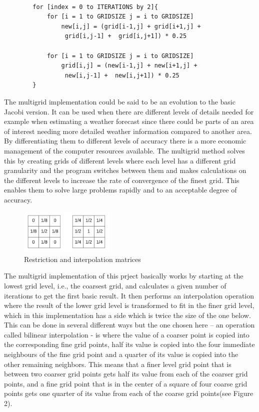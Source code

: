 \documentclass{article}
\begin{document}
\begin{verbatim}

        for [index = 0 to ITERATIONS by 2]{
            for [i = 1 to GRIDSIZE j = i to GRIDSIZE]
                new[i,j] = (grid[i-1,j] + grid[i+1,j] +
                 grid[i,j-1] +  grid[i,j+1]) * 0.25
	
            for [i = 1 to GRIDSIZE j = i to GRIDSIZE]
                grid[i,j] = (new[i-1,j] + new[i+1,j] + 
                 new[i,j-1] +  new[i,j+1]) * 0.25
        }

\end{verbatim}


The multigrid implementation could be said to be an evolution to the basic Jacobi version. It can be used when there are different levels of details needed for example when estimating a weather forecast since there could be parts of an area of interest needing more detailed weather information compared to another area. By differentiating them to different levels of accuracy there is a more economic management of the computer resources available. The multigrid method solves this by creating grids of different levels where each level has a different grid granularity and the program switches between them and makes calculations on the different levels to increase the rate of convergence of the finest grid. This enables them to solve large problems rapidly and to an acceptable degree of accuracy.

\begin{figure}
    \includegraphics[width=0.4\textwidth]{../images/lvloperations.png}
    \caption{Restriction and interpolation matrices}
    \label{fig:basic}
\end{figure}

The multigrid implementation of this prject basically works by starting at the lowest grid level, i.e., the coarsest grid, and calculates a given number of iterations to get the first basic result. It then performs an interpolation operation where the result of the lower grid level is transformed to fit in the finer grid level, which in this implementation has a side which is twice the size of the one below. This can be done in several different ways but the one chosen here – an operation called bilinear interpolation - is where the value of a coarser point is copied into the corresponding fine grid points, half its value is copied into the four immediate neighbours of the fine grid point and a quarter of its value is copied into the other remaining neighbors. This means that a finer level grid point that is between two coarser grid points gets half its value from each of the coarser grid points, and a fine grid point that is in the center of a square of four coarse grid points gets one quarter of its value from each of the coarse grid points(see Figure 2).
\end{document}
